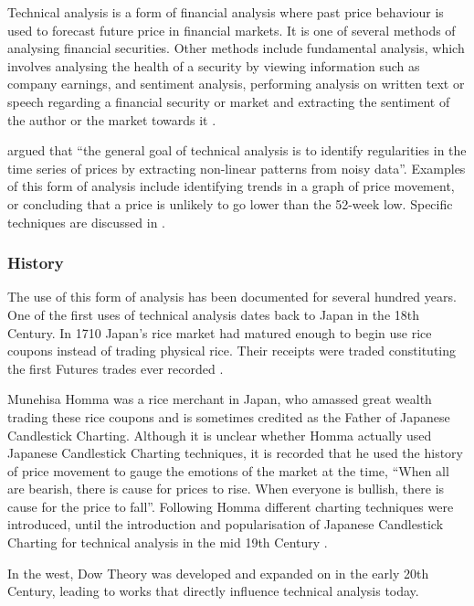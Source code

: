 \documentclass[12pt]{article}
\theoremstyle{definition}
\begin{document}
Technical analysis is a form of financial analysis where past price behaviour is used to forecast future price in financial markets. It is one of several methods of analysing financial securities. Other methods include fundamental analysis, which involves analysing the health of a security by viewing information such as company earnings, and sentiment analysis, performing analysis on written text or speech regarding a financial security or market and extracting the sentiment of the author or the market towards it \citep[p. 2]{ahmad2011affective}.

\cite{foundations} argued that ``the general goal of technical analysis is to identify regularities in the time series of prices by extracting non-linear patterns from noisy data''. Examples of this form of analysis include identifying trends in a graph of price movement, or concluding that a price is unlikely to go lower than the 52-week low. Specific techniques are discussed in .

\subsubsection{History}
\label{tahist}
The use of this form of analysis has been documented for several hundred years. One of the first uses of technical analysis dates back to Japan in the 18th Century. In 1710 Japan's rice market had matured enough to begin use rice coupons instead of trading physical rice. Their receipts were traded constituting the first Futures trades ever recorded \citep[p.15]{jcct1991}. 

Munehisa Homma was a rice merchant in Japan, who amassed great wealth trading these rice coupons and is sometimes credited as the Father of Japanese Candlestick Charting. Although it is unclear whether Homma actually used Japanese Candlestick Charting techniques, it is recorded that he used the history of price movement to gauge the emotions of the market at the time, ``When all are bearish, there is cause for prices to rise. When everyone is bullish, there is cause for the price to fall''. Following Homma different charting techniques were introduced, until the introduction and popularisation of Japanese Candlestick Charting for technical analysis in the mid 19th Century \citep[p.18]{jcct1994}.

In the west, Dow Theory was developed and expanded on in the early 20th Century, leading to works \citep{edwards2012technical} that directly influence technical analysis today.
\end{document}
